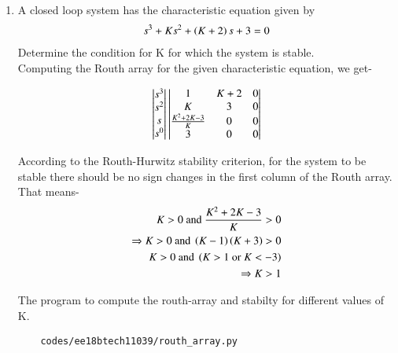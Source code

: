 \begin{enumerate}[label=\thesubsection.\arabic*.,ref=\thesubsection.\theenumi]

\item A closed loop system has the characteristic equation given by \begin{align} s^3+Ks^2+\left(K+2\right)s+3 = 0 \end{align}Determine the condition for K for which the system is stable.\\
\solution
Computing the Routh array for the given characteristic equation, we get-

\begin{align}
    \begin{vmatrix}s^3 \\ s^2 \\ s \\ s^0\end{vmatrix} 
    \begin{vmatrix}1 & K+2 & 0 \\ K & 3 & 0 \\ \frac{K^2+2K-3}{K} & 0 & 0 \\ 3 & 0 & 0\end{vmatrix}
\end{align}

According to the Routh-Hurwitz stability criterion, for the system to be stable there should be no sign changes in the first column of the Routh array. That means-
\begin{align}
    K > 0 \text{ and } \frac{K^2+2K-3}{K} > 0 \\
    \Rightarrow K > 0 \text{ and } \left(K-1\right)\left(K+3\right) > 0 \\
    K > 0 \text{ and } \left(K > 1 \text{ or } K < -3\right) \\
    \Rightarrow K > 1 \\
\end{align}

The program to compute the routh-array and stabilty for different values of K.
\begin{lstlisting}
    codes/ee18btech11039/routh_array.py
\end{lstlisting}

\end{enumerate}

